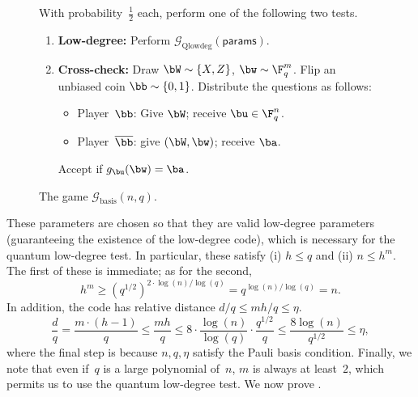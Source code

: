 \documentclass[11pt]{article}
\newcommand{\params}{\mathsf{params}}
\newcommand{\game}{\mathscr{G}}
\begin{document}
{
\begin{figure}
With probability~$\tfrac{1}{2}$ each, perform one of the following two tests.
\begin{enumerate}
\item \textbf{Low-degree:} Perform $\game_{\mathrm{Qlowdeg}}(\params)$. \label{item:qlowdeg-test}
\item \textbf{Cross-check:}  Draw $\bW \sim \{X, Z\}$, $\bw \sim \F_q^m$. Flip an unbiased coin $\bb \sim \{0, 1\}$.
	Distribute the questions as follows:
	\begin{itemize}
	\item[$\circ$] Player~$\bb$: Give $\bW$; receive $\bu \in \F_q^n$.
	\item[$\circ$] Player~$\overline{\bb}$: give $(\bW,\bw)$; receive $\ba$.
	\end{itemize}
	Accept if $g_{\bu}(\bw) = \ba$.
\end{enumerate} \label{item:check-with-qlowdeg}
\caption{The game $\game_{\mathrm{basis}}(n,q)$.\label{fig:pauli-basis}}
\end{figure}
}

These parameters are chosen so that they are valid low-degree parameters
(guaranteeing the existence of the low-degree code),
which is necessary for the quantum low-degree test.
In particular, these satisfy (i) $h \leq q$ and (ii) $n \leq h^m$.
The first of these is immediate; as for the second,
\begin{equation*}
h^m \geq (q^{1/2})^{2 \cdot \log(n)/\log(q)} = q^{\log(n)/\log(q)} = n.
\end{equation*}
In addition, the code has relative distance $d/q \leq mh/q \leq \eta$.
\begin{equation*}
\frac{d}{q} = \frac{m \cdot(h-1)}{q} \leq \frac{m h}{q} \leq 8\cdot \frac{\log(n)}{\log(q)} \cdot \frac{q^{1/2}}{q} \leq \frac{8 \log(n)}{q^{1/2}} \leq \eta,
\end{equation*}
where the final step is because $n, q, \eta$ satisfy the Pauli basis condition.
Finally, we note that even if~$q$ is a large polynomial of~$n$, $m$ is always at least~$2$, which permits us to use the quantum low-degree test.
We now prove .
\end{document}
